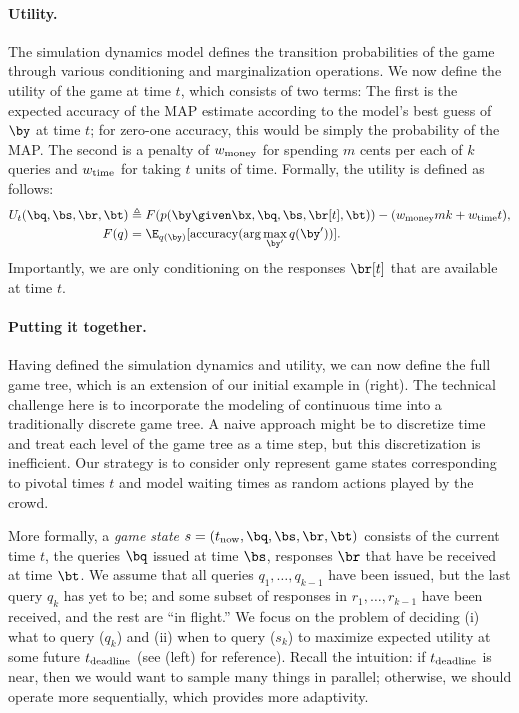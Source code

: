 \paragraph{Utility.}

The simulation dynamics model defines the transition probabilities of the game
through various conditioning and marginalization operations.
We now define the utility of the game at time $t$, which consists of two terms:
The first is the expected accuracy of the MAP estimate according to the model's best guess of $\by$ at time $t$;
for zero-one accuracy, this would be simply the probability of the MAP.
The second is a penalty of $w_\text{money}$ for spending $m$ cents per each of $k$ queries
and $w_\text{time}$ for taking $t$ units of time.
Formally, the utility is defined as follows:
\begin{align}
  U_t(\bq, \bs, \br, \bt) &\eqdef F(p(\by \given \bx, \bq, \bs, \br[t], \bt)) - (\weightmoney m k + \weighttime t), \\
  F(q) &= \E_{q(\by)}[\accuracy(\arg\max_{\by'} q(\by'))].
\end{align}
Importantly, we are only conditioning on the responses $\br[t]$ that are available at time $t$.

\paragraph{Putting it together.}

Having defined the simulation dynamics and utility, we can now define the full game tree,
which is an extension of our initial example in (right).
The technical challenge here is to incorporate the modeling of continuous time
into a traditionally discrete game tree.
A naive approach might be to discretize time and treat each level of the game
tree as a time step, but this discretization is inefficient.
Our strategy is to consider only represent game states corresponding to pivotal times $t$
and model waiting times as random actions played by the crowd.

More formally, a \emph{game state} $s = (\now, \bq, \bs, \br, \bt)$
consists of the current time $t$, the queries $\bq$ issued at time $\bs$,
responses $\br$ that have be received at time $\bt$.
We assume that all queries $q_1, \dots, q_{k-1}$ have been issued,
but the last query $q_k$ has yet to be;
and some subset of responses in $r_1, \dots, r_{k-1}$ have been received,
and the rest are ``in flight.''
We focus on the problem of deciding (i) what to query ($q_k$)
and (ii) when to query ($s_k$) to maximize expected utility
at some future $t_\text{deadline}$ (see (left) for reference).
Recall the intuition: if $t_\text{deadline}$ is near, then we would want to sample
many things in parallel; otherwise, we should operate more sequentially,
which provides more adaptivity.

